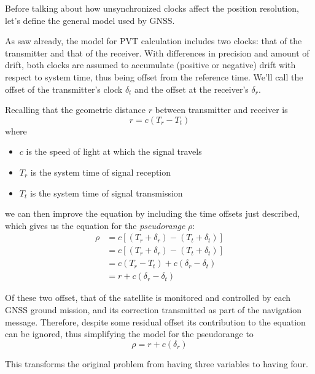 Before talking about how unsynchronized clocks affect the position resolution,
let's define the general model used by GNSS.

As saw already, the model for PVT calculation includes two clocks: that of the
transmitter and that of the receiver. With differences in precision and amount
of drift, both clocks are assumed to accumulate (positive or negative) drift
with respect to system time, thus being offset from the reference time.
We'll call the offset of the transmitter's clock $\delta_t$ and the offset at
the receiver's $\delta_r$.

Recalling that the geometric distance $r$ between transmitter and receiver is
\begin{equation}
  r = c(T_r - T_t)
\end{equation}
where
\begin{itemize}
  \item $c$ is the speed of light at which the signal travels
  \item $T_r$ is the system time of signal reception
  \item $T_t$ is the system time of signal transmission
\end{itemize}
we can then improve the equation by including the time offsets just described,
which gives us the equation for the \textit{pseudorange} $\rho$:
\begin{equation}
  \begin{aligned}
    \rho &= c[(T_r + \delta_r) - (T_t + \delta_t)] \\
    & = c[(T_r + \delta_r) - (T_t + \delta_t)] \\
    & = c(T_r - T_t) + c(\delta_r - \delta_t) \\
    & = r + c(\delta_r - \delta_t)
  \end{aligned}
\end{equation}

Of these two offset, that of the satellite is monitored and controlled by each
GNSS ground mission, and its correction transmitted as part of the navigation
message. Therefore, despite some residual offset its contribution to the
equation can be ignored, thus simplifying the model for the pseudorange to
\begin{equation} \label{eq:pseudorange}
  \rho = r + c(\delta_r)
\end{equation}

This transforms the original problem from having three variables to having four.


